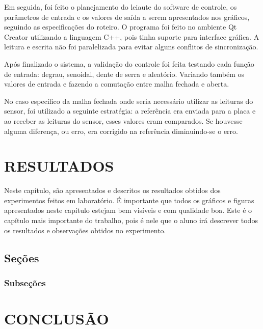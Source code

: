 \documentclass[a4paper,12pt]{article}
\begin{document}
Em seguida, foi feito o planejamento do leiaute do software de controle, os parâmetros de entrada e os valores de saída a serem apresentados nos gráficos, seguindo as especificações do roteiro. O programa foi feito no ambiente Qt Creator utilizando a linguagem C++, pois tinha suporte para interface gráfica. A leitura e escrita não foi paralelizada para evitar alguns conflitos de sincronização. 

Após finalizado o sistema, a validação do controle foi feita testando cada função de entrada: degrau, senoidal, dente de serra e aleatório. Variando também os valores de entrada e fazendo a comutação entre malha fechada e aberta. 

No caso específico da malha fechada onde seria necessário utilizar as leituras do sensor, foi utilizado a seguinte estratégia: a referência era enviada para a placa e ao receber as leituras do sensor, esses valores eram comparados. Se houvesse alguma diferença, ou erro, era corrigido na referência diminuindo-se o erro.


\newpage


\thispagestyle{main}

\section{RESULTADOS}


\hspace{4ex}Neste capítulo, são apresentados e descritos os resultados obtidos dos experimentos feitos em laboratório. É importante que todos os gráficos e figuras apresentados neste capítulo estejam bem visíveis e com qualidade boa. Este é o capítulo mais importante do trabalho, pois é nele que o aluno irá descrever todos os resultados e observações obtidos no experimento.

\subsection{Seções}

\subsubsection{Subseções}

\newpage


\thispagestyle{main}

\section{CONCLUSÃO}
\end{document}
